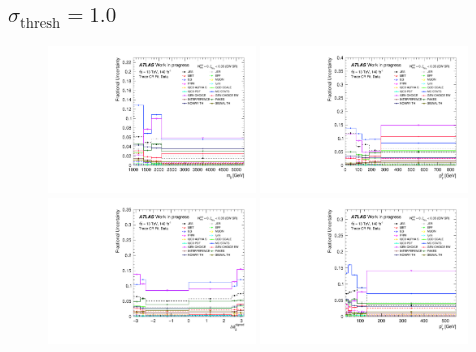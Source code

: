 \subsection{$\sigma_{\text{thresh}}=1.0$}

\begin{figure}[H]
    \centering
    \includegraphics[width=0.49\textwidth]{plots/diffx/sigthresholds/1p0/Systematic_Uncertainties_data_mjj_3cr_QCD_Sh2211_1p0sigma.pdf}
    \includegraphics[width=0.49\textwidth]{plots/diffx/sigthresholds/1p0/Systematic_Uncertainties_data_jj_pt_3cr_QCD_Sh2211_1p0sigma.pdf}
    \includegraphics[width=0.49\textwidth]{plots/diffx/sigthresholds/1p0/Systematic_Uncertainties_data_jj_dphi_3cr_QCD_Sh2211_1p0sigma.pdf}
    \includegraphics[width=0.49\textwidth]{plots/diffx/sigthresholds/1p0/Systematic_Uncertainties_data_lep_pt_3cr_QCD_Sh2211_1p0sigma.pdf}

\end{figure}
